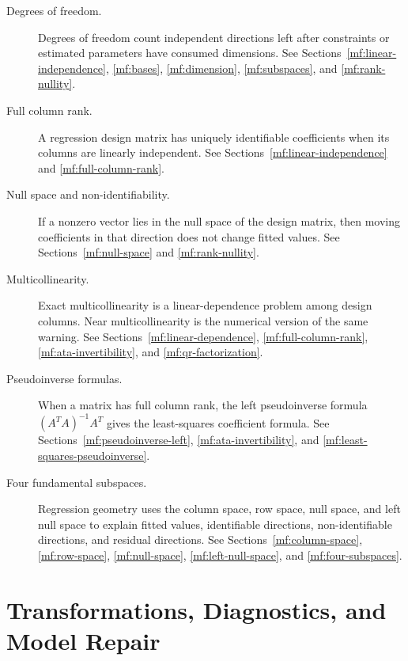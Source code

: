 \begin{description}
    \item[Degrees of freedom.] Degrees of freedom count independent directions left after constraints or estimated parameters have consumed dimensions. See Sections~\ref{mf:linear-independence}, \ref{mf:bases}, \ref{mf:dimension}, \ref{mf:subspaces}, and \ref{mf:rank-nullity}.

    \item[Full column rank.] A regression design matrix has uniquely identifiable coefficients when its columns are linearly independent. See Sections~\ref{mf:linear-independence} and \ref{mf:full-column-rank}.

    \item[Null space and non-identifiability.] If a nonzero vector lies in the null space of the design matrix, then moving coefficients in that direction does not change fitted values. See Sections~\ref{mf:null-space} and \ref{mf:rank-nullity}.

    \item[Multicollinearity.] Exact multicollinearity is a linear-dependence problem among design columns. Near multicollinearity is the numerical version of the same warning. See Sections~\ref{mf:linear-dependence}, \ref{mf:full-column-rank}, \ref{mf:ata-invertibility}, and \ref{mf:qr-factorization}.

    \item[Pseudoinverse formulas.] When a matrix has full column rank, the left pseudoinverse formula \((A^TA)^{-1}A^T\) gives the least-squares coefficient formula. See Sections~\ref{mf:pseudoinverse-left}, \ref{mf:ata-invertibility}, and \ref{mf:least-squares-pseudoinverse}.

    \item[Four fundamental subspaces.] Regression geometry uses the column space, row space, null space, and left null space to explain fitted values, identifiable directions, non-identifiable directions, and residual directions. See Sections~\ref{mf:column-space}, \ref{mf:row-space}, \ref{mf:null-space}, \ref{mf:left-null-space}, and \ref{mf:four-subspaces}.
\end{description}

\section{Transformations, Diagnostics, and Model Repair}
\label{mf:da-bridge-transformations-diagnostics}

